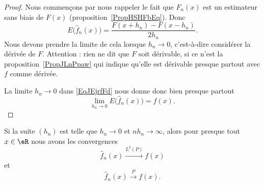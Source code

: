 \begin{proof}
	Nous commençons par nous rappeler le fait que \( F_n(x)\) est un estimateur sans biais de \( F(x)\) (proposition~\ref{PropHSHFbEq}). Donc
	\begin{equation}    \label{EqJEjrfFd}
		E\big( \hat f_n(x) \big)=\frac{ F(x+h_n)-F(x-h_n) }{ 2h_n }.
	\end{equation}
	Nous devons prendre la limite de cela lorsque \( h_n\to 0\), c'est-à-dire considérer la dérivée de \( F\). Attention : rien ne dit que \( F\) soit dérivable, si ce n'est la proposition~\ref{PropJLnPpaw} qui indique qu'elle est dérivable presque partout avec \( f\) comme dérivée.

	La limite \( h_n\to 0\) dans \eqref{EqJEjrfFd} nous donne donc bien presque partout
	\begin{equation}
		\lim_{h_n\to 0} E\big( \hat f_n(x) \big)=f(x).
	\end{equation}
\end{proof}

\begin{proposition}
	Si la suite \( (h_n)\) est telle que \( h_n\to 0\) et \( nh_n\to \infty\), alors pour presque tout \( x\in \eR\) nous avons les convergences
	\begin{equation}
		\hat f_n(x)\stackrel{L^2(P)}{\to}f(x)
	\end{equation}
	et
	\begin{equation}
		\hat f_n(x)\stackrel{P}{\to}f(x).
	\end{equation}
\end{proposition}

